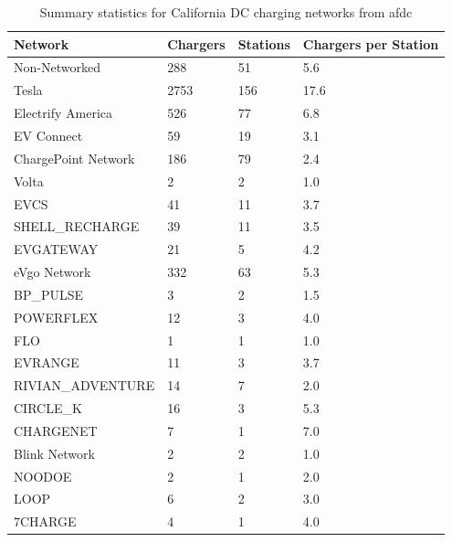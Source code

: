\documentclass[11pt]{article}
\begin{document}
\begin{multicols}{2}
%
%

\begin{table}[H]
	\centering
	\caption{Summary statistics for California DC charging networks from \gls{afdc}}
	\label{tab:summary_statistics_afdc}
	\begin{tabular}{|C{.46\linewidth}|C{.18\linewidth}|C{.18\linewidth}|C{.18\linewidth}|}
		\hline Network & Chargers & Stations & Chargers per Station \\
		\hline Non-Networked & 288 & 51 & 5.6 \\
		\hline Tesla & 2753 & 156 & 17.6 \\
		\hline Electrify America & 526 & 77 & 6.8 \\
		\hline EV Connect & 59 & 19 & 3.1 \\
		\hline ChargePoint Network & 186 & 79 & 2.4 \\
		\hline Volta & 2 & 2 & 1.0 \\
		\hline EVCS & 41 & 11 & 3.7 \\
		\hline SHELL_RECHARGE & 39 & 11 & 3.5 \\
		\hline EVGATEWAY & 21 & 5 & 4.2 \\
		\hline eVgo Network & 332 & 63 & 5.3 \\
		\hline BP_PULSE & 3 & 2 & 1.5 \\
		\hline POWERFLEX & 12 & 3 & 4.0 \\
		\hline FLO & 1 & 1 & 1.0 \\
		\hline EVRANGE & 11 & 3 & 3.7 \\
		\hline RIVIAN_ADVENTURE & 14 & 7 & 2.0 \\
		\hline CIRCLE_K & 16 & 3 & 5.3 \\
		\hline CHARGENET & 7 & 1 & 7.0 \\
		\hline Blink Network & 2 & 2 & 1.0 \\
		\hline NOODOE & 2 & 1 & 2.0 \\
		\hline LOOP & 6 & 2 & 3.0 \\
		\hline 7CHARGE & 4 & 1 & 4.0 \\
		\hline
	\end{tabular}
\end{table}


\end{multicols}
\end{document}
